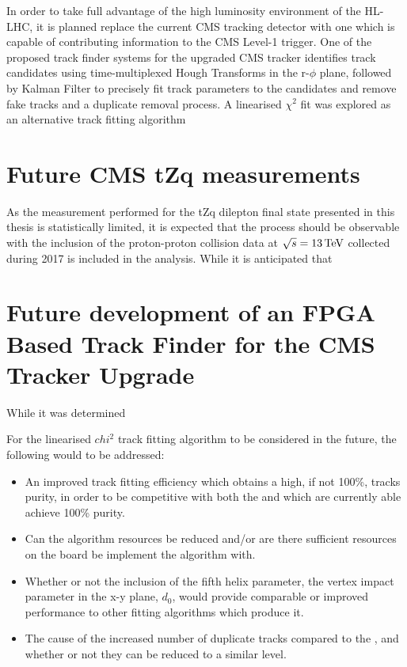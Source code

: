 
In order to take full advantage of the high luminosity environment of the HL-LHC, it is planned replace the current CMS tracking detector with one which is capable of contributing information to the CMS Level-1 trigger.
One of the proposed track finder systems for the upgraded CMS tracker identifies track candidates using time-multiplexed Hough Transforms in the r-$\phi$ plane, followed by Kalman Filter to precisely fit track parameters to the candidates and remove fake tracks and a duplicate removal process.
A linearised $\chi^{2}$ fit was explored as an alternative track fitting algorithm

\section{Future CMS tZq measurements}
As the measurement performed for the tZq dilepton final state presented in this thesis is statistically limited, it is expected that the process should be observable with the inclusion of the proton-proton collision data at $\sqrt{s} = 13\,\text{Te\hspace{-.08em}V}$ collected during 2017 is included in the analysis.
While it is anticipated that 


\section{Future development of an FPGA Based Track Finder for the CMS Tracker Upgrade}
While it was determined 

For the linearised $chi^{2}$ track fitting algorithm to be considered in the future, the following would to be addressed:
\begin{itemize}
\item An improved track fitting efficiency which obtains a high, if not 100\%, tracks purity, in order to be competitive with both the \KF and \LR which are currently able achieve 100\% purity.
\item Can the algorithm resources be reduced and/or are there sufficient resources on the board be implement the algorithm with.
\item Whether or not the inclusion of the fifth helix parameter, the vertex impact parameter in the x-y plane, $d_{0}$, would provide comparable or improved performance to other fitting algorithms which produce it.
\item The cause of the increased number of duplicate tracks compared to the \KF, and whether or not they can be reduced to a similar level.
\end{itemize}

